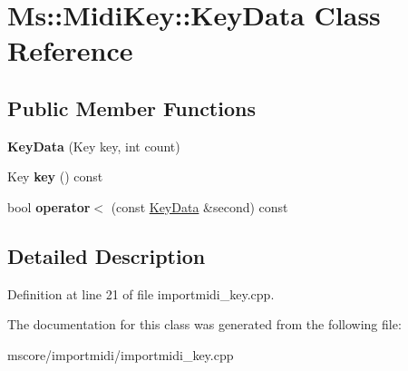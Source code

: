 \hypertarget{class_ms_1_1_midi_key_1_1_key_data}{}\section{Ms\+:\+:Midi\+Key\+:\+:Key\+Data Class Reference}
\label{class_ms_1_1_midi_key_1_1_key_data}
\subsection*{Public Member Functions}
\begin{DoxyCompactItemize}
\item 
\mbox{\label{class_ms_1_1_midi_key_1_1_key_data_a2fe4f829664c1e6e9ed652e5ebb071c9}} 
{\bfseries Key\+Data} (Key key, int count)
\item 
\mbox{\label{class_ms_1_1_midi_key_1_1_key_data_ac861bbc3eec4cd3466feca2ccb0e8e9f}} 
Key {\bfseries key} () const
\item 
\mbox{\label{class_ms_1_1_midi_key_1_1_key_data_a94833e3b914b106caf470fff8b110eff}} 
bool {\bfseries operator$<$} (const \hyperlink{class_ms_1_1_midi_key_1_1_key_data}{Key\+Data} \&second) const
\end{DoxyCompactItemize}


\subsection{Detailed Description}


Definition at line 21 of file importmidi\+\_\+key.\+cpp.



The documentation for this class was generated from the following file\+:\begin{DoxyCompactItemize}
\item 
mscore/importmidi/importmidi\+\_\+key.\+cpp\end{DoxyCompactItemize}
